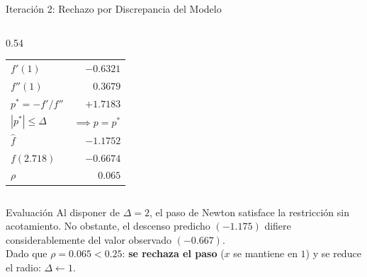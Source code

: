 \begin{frame}{Iteración 2: Rechazo por Discrepancia del Modelo}
\begin{columns}[T]
\begin{column}{0.54\textwidth}
\begin{tabular}{@{}l@{\ }r@{}}
                \(f'(1)\)  & \(-0.6321\) \\
                \(f''(1)\) & $0.3679$ \\[0.25em]
                \(p^{*} = -f'/f''\) & \(+1.7183\) \\
                \(|p^{*}| \le \Delta\) & \(\implies p = p^{*}\) \\[0.25em]
                \(\hat f\) & \(\mathbf{-1.1752}\) \\
                \(f(2.718)\) & \(\mathbf{-0.6674}\) \\[0.25em]
                \(\rho\) & \textcolor{RojoAlerta}{\(\mathbf{0.065}\)} \\
            \end{tabular}
        \end{column}
    \end{columns}

    \vspace{0.3em}
    \begin{alertblock}{Evaluación}
        \scriptsize
        Al disponer de \(\Delta=2\), el paso de Newton satisface la restricción sin acotamiento. No obstante, el descenso predicho \((-1.175)\) difiere considerablemente del valor observado \((-0.667)\).
        \\[0.2em]
        Dado que \(\rho = 0.065 < 0.25\): \textcolor{RojoAlerta}{\textbf{se rechaza el paso}} (\(x\) se mantiene en $1$) y se reduce el radio: \(\Delta \gets 1\).
    \end{alertblock}
\end{frame}


